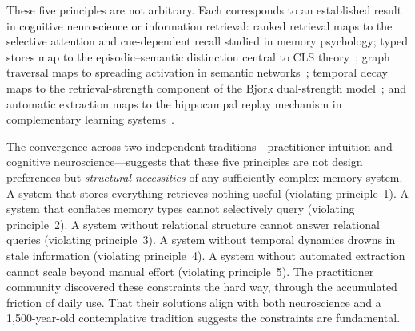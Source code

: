 These five principles are not arbitrary.  Each corresponds to an
established result in cognitive neuroscience or information retrieval:
ranked retrieval maps to the selective attention and cue-dependent
recall studied in memory psychology; typed stores map to the
episodic--semantic distinction central to CLS
theory~\cite{mcclelland1995}; graph traversal maps to spreading
activation in semantic networks~\cite{collins1975}; temporal decay
maps to the retrieval-strength component of the Bjork dual-strength
model~\cite{bjork1992}; and automatic extraction maps to the
hippocampal replay mechanism in complementary learning
systems~\cite{mcclelland1995}.

The convergence across two independent traditions---practitioner
intuition and cognitive neuroscience---suggests that these five
principles are not design
preferences but \emph{structural necessities} of any sufficiently
complex memory system.  A system that stores everything retrieves
nothing useful (violating principle~1).  A system that conflates memory
types cannot selectively query (violating principle~2).  A system
without relational structure cannot answer relational queries (violating
principle~3).  A system without temporal dynamics drowns in stale
information (violating principle~4).  A system without automated
extraction cannot scale beyond manual effort (violating principle~5).
The practitioner community discovered these constraints the hard way,
through the accumulated friction of daily use.  That their solutions
align with both neuroscience and a 1,500-year-old contemplative
tradition suggests the constraints are fundamental.
